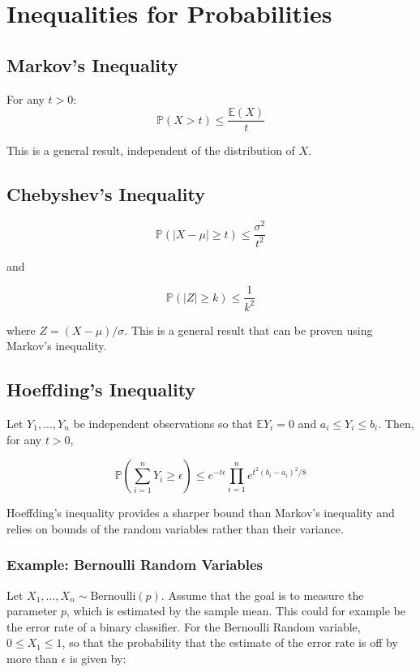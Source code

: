 \section{Inequalities for Probabilities}

\subsection{Markov's Inequality}

For any $t>0$: 
\begin{equation}
\mathbb{P}(X > t) \leq \frac{\mathbb{E}(X)}{t}
\end{equation}

This is a general result, independent of the distribution of $X$.

\subsection{Chebyshev's Inequality}

\begin{equation}
\mathbb{P}(|X-\mu| \geq t) \leq \frac{\sigma^2}{t^2}
\end{equation}

and

\begin{equation}
\mathbb{P}(|Z| \geq k) \leq \frac{1}{k^2}
\end{equation}

where $Z = (X-\mu)/\sigma$. This is a general result that can be proven using Markov's inequality.

\subsection{Hoeffding's Inequality}
Let $Y_1,...,Y_n$ be independent observations so that $\mathbb{E}Y_i = 0$ and $a_i \leq Y_i \leq b_i$. Then, for any $t>0$,

\begin{equation}
\mathbb{P}\left( \sum_{i=1}^n Y_i \geq \epsilon \right) \leq e^{-t\epsilon}\prod_{i=1}^n e^{t^2 (b_i - a_i)^2/8}
\end{equation}

Hoeffding's inequality provides a sharper bound than Markov's inequality and relies on bounds of the random variables rather than their variance.

\subsubsection{Example: Bernoulli Random Variables}
Let $X_1,...,X_n \sim \mathrm{Bernoulli}(p)$. Assume that the goal is to measure the parameter $p$, which is estimated by the sample mean. This could for example be the error rate of a binary classifier. For the Bernoulli Random variable, $0\leq X_1 \leq 1$, so that the probability that the estimate of the error rate is off by more than $\epsilon$ is given by:

